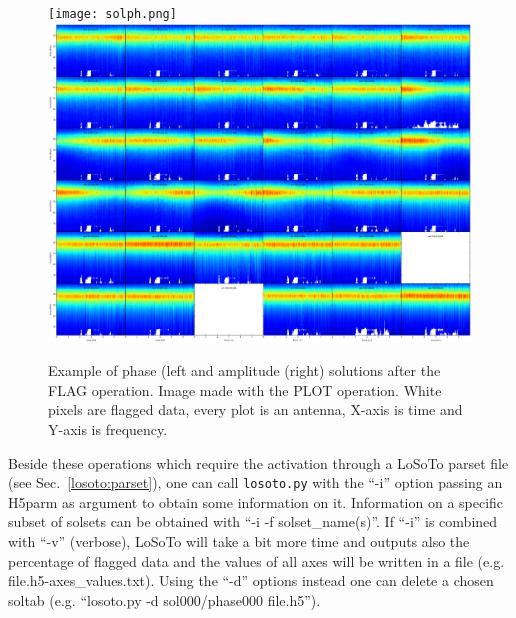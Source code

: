 \documentclass[]{article}
\def \losoto {LoSoTo}
\begin{document}
\begin{figure}
\centering
\texttt{[image: solph.png]}
\includegraphics[width=.48\columnwidth]{solamp.png}
\caption{Example of phase (left and amplitude (right) solutions after the FLAG operation. Image made with the PLOT operation. White pixels are flagged data, every plot is an antenna, X-axis is time and Y-axis is frequency.}\label{fig:flag}
\end{figure}

Beside these operations which require the activation through a \losoto{} parset file (see Sec.~\ref{losoto:parset}), one can call \texttt{losoto.py} with the ``-i'' option passing an H5parm as argument to obtain some information on it. Information on a specific subset of solsets can be obtained with ``-i -f solset\_name(s)''. If ``-i'' is combined with ``-v'' (verbose), \losoto{} will take a bit more time and outputs also the percentage of flagged data and the values of all axes will be written in a file (e.g. file.h5-axes\_values.txt). Using the ``-d'' options instead one can delete a chosen soltab (e.g. ``losoto.py -d sol000/phase000 file.h5'').
\end{document}
